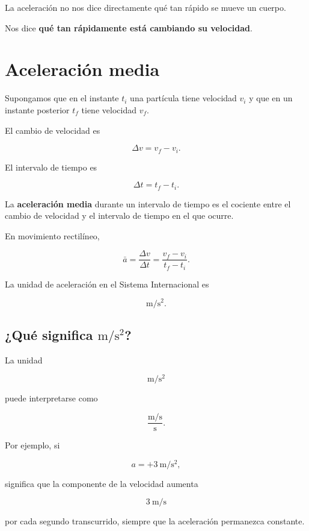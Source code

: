 \begin{idea}
La aceleración no nos dice directamente qué tan rápido se mueve un cuerpo.

Nos dice \textbf{qué tan rápidamente está cambiando su velocidad}.
\end{idea}


\section{Aceleración media}

Supongamos que en el instante \(t_i\) una partícula tiene velocidad \(v_i\)
y que en un instante posterior \(t_f\) tiene velocidad \(v_f\).

El cambio de velocidad es

\[ \Delta v=v_f-v_i. \]

El intervalo de tiempo es

\[ \Delta t=t_f-t_i. \]

\begin{definicion}
La \textbf{aceleración media} durante un intervalo de tiempo es el cociente
entre el cambio de velocidad y el intervalo de tiempo en el que ocurre.
\end{definicion}

En movimiento rectilíneo,

\[ \boxed{\bar{a}=\frac{\Delta v}{\Delta t}
=\frac{v_f-v_i}{t_f-t_i}}. \]

La unidad de aceleración en el Sistema Internacional es

\[ \si{\meter\per\second\squared}. \]


\subsection{¿Qué significa \(\si{\meter\per\second\squared}\)?}

La unidad

\[ \si{\meter\per\second\squared} \]

puede interpretarse como

\[ \frac{\si{\meter\per\second}}{\si{\second}}. \]

Por ejemplo, si

\[ a=+\SI{3}{\meter\per\second\squared}, \]

significa que la componente de la velocidad aumenta

\[ \SI{3}{\meter\per\second} \]

por cada segundo transcurrido, siempre que la aceleración permanezca
constante.

